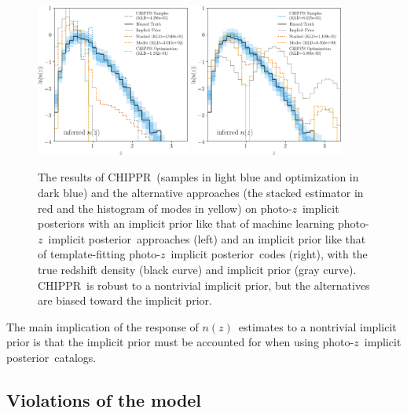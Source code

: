 \documentclass[iop]{emulateapj}
\newcommand{\todo}[3]{{\color{#2}\emph{#1}: #3}}
\newcommand{\aim}[1]{\todo{AIM}{red}{#1}}
\newcommand{\project}[1]{\textsc{#1}}
\newcommand{\Chippr}{\project{CHIPPR}}%
\newcommand{\pz}{photo-$z$}
\newcommand{\pzip}{\pz\ implicit posterior}
\newcommand{\nz}{$n(z)$}
\begin{document}
\begin{figure}
	\begin{center}
		\includegraphics[width=0.45\textwidth]{figures/chippr/single_lsst_trpr_log_estimators.png}
		\includegraphics[width=0.45\textwidth]{figures/chippr/single_lsst_tmpr_log_estimators.png}
		\caption
		{The results of \Chippr\ (samples in light blue and optimization in dark blue) and the alternative approaches (the stacked estimator in red and the histogram of modes in yellow) on \pzip s with an implicit prior like that of machine learning \pzip\ approaches (left) and an implicit prior like that of template-fitting \pzip\ codes (right), with the true redshift density (black curve) and implicit prior (gray curve).
			\Chippr\ is robust to a nontrivial implicit prior, but the alternatives are biased toward the implicit prior.
		}
		\label{fig:results-priors}
	\end{center}
\end{figure}

The main implication of the response of \nz\ estimates to a nontrivial implicit prior is that the implicit prior must be accounted for when using \pzip\ catalogs.

\subsection{Violations of the model}
\label{sec:violations}
\end{document}
